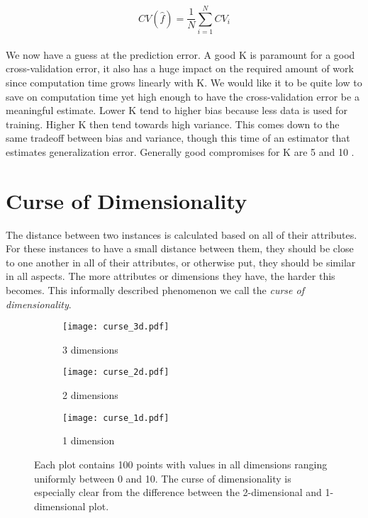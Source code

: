 $$
CV(\hat{f}) = \frac{1}{N} \sum^{N}_{i=1} CV_i
$$

\paragraph{}
We now have a guess at the prediction error.
A good K is paramount for a good cross-validation error,
it also has a huge impact on the required amount of work
since computation time grows linearly with K.
We would like it to be quite low to save on computation time
yet high enough to have the cross-validation error
be a meaningful estimate.
Lower K tend to higher bias
because less data is used for training.
Higher K then tend towards
high variance.
This comes down to the same tradeoff between
bias and variance,
though this time of an estimator
that estimates generalization error.
Generally good compromises for K are 5 and 10
\parencite{kohavi1995study}.

\section{Curse of Dimensionality}
The distance between two instances is calculated based on all of their attributes.
For these instances to have a small distance between them,
they should be close to one another in all of their attributes,
or otherwise put,
they should be similar in all aspects.
The more attributes or dimensions they have,
the harder this becomes.
This informally described phenomenon we call
the \textit{curse of dimensionality}.

\begin{figure}[ht]
\center

\begin{subfigure}{.49\textwidth}
  \centering
  \texttt{[image: curse\_3d.pdf]}
  \caption{3 dimensions}
  \label{fig.ml.cod3}
\end{subfigure}
\begin{subfigure}{.49\textwidth}
  \centering
  \texttt{[image: curse\_2d.pdf]}
  \caption{2 dimensions}
  \label{fig.ml.cod2}
\end{subfigure}
\begin{subfigure}{.45\textwidth}
  \centering
  \texttt{[image: curse\_1d.pdf]}
  \caption{1 dimension}
  \label{fig.ml.cod1}
\end{subfigure}

\caption[Curse of dimensionality]{Each plot contains 100 points
with values in all dimensions ranging
uniformly between 0 and 10.
The curse of dimensionality is especially clear
from the difference between the 2-dimensional
and 1-dimensional plot.
}
\label{fig.ml.cod}
\end{figure}

